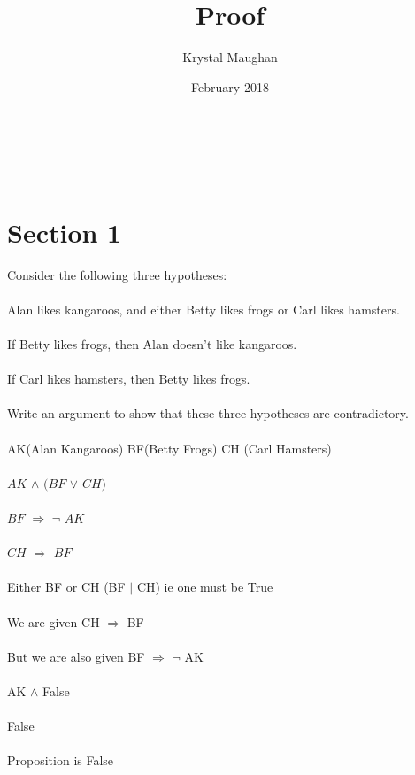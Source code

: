 \documentclass{article}
\title{Proof}
\author{Krystal Maughan }
\date{February 2018}
\begin{document}
\maketitle

\\
\\
\section{Section 1} 
Consider the following three hypotheses:
\\
\\
Alan likes kangaroos, and either Betty likes frogs or Carl likes hamsters.
\\
\\
If Betty likes frogs, then Alan doesn't like kangaroos.
\\
\\
If Carl likes hamsters, then Betty likes frogs.
\\
\\
Write an argument to show that these three hypotheses
are contradictory.
\\
\\
AK(Alan Kangaroos)
BF(Betty Frogs)
CH (Carl Hamsters)
\\
\\
$AK$ $\land$ $(BF$ $\vee$ $CH)$
\\
\\
$BF$ $\Rightarrow$ $\lnot$ $AK$
\\
\\
$CH$ $\Rightarrow$ $BF$
\\
\\
Either BF or CH (BF $|$ CH) ie one must be True
\\
\\
We are given CH $\Rightarrow$ BF
\\
\\
But we are also given BF $\Rightarrow$ $\neg$ AK
\\
\\
AK $\land$ False
\\
\\
False
\\
\\
Proposition is False
\end{document}
